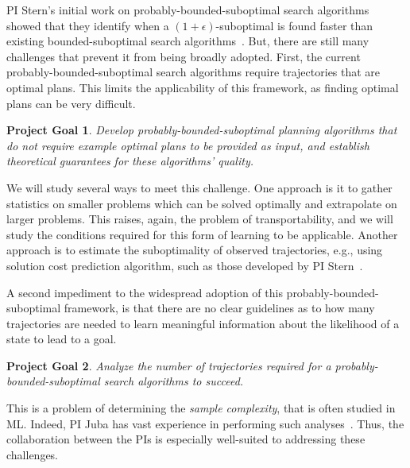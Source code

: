 \documentclass[12pt]{article}
\newtheorem{problem}{Project Goal}
\begin{document}

PI Stern's initial work on probably-bounded-suboptimal search algorithms showed 
that they identify when a $(1+\epsilon)$-suboptimal is found faster than existing bounded-suboptimal search algorithms~\cite{stern2011probably,stern2012search}.
But, there are still many challenges that prevent it from being broadly adopted. First, the current probably-bounded-suboptimal search algorithms require trajectories that are optimal plans. This limits the applicability of this framework, as finding optimal plans can be very difficult. 
\begin{problem}
Develop probably-bounded-suboptimal planning algorithms that do not require example optimal plans to be provided as input, and establish theoretical guarantees for these algorithms' quality.
\end{problem}
We will study several ways to meet this challenge. One approach is it to gather statistics on smaller problems which can be solved optimally and extrapolate on larger problems. This raises, again, the problem of transportability, and we will study the conditions required for this form of learning to be applicable. 
Another approach is to estimate the suboptimality of observed trajectories, e.g., using solution cost prediction algorithm, such as those developed by PI Stern~\cite{lelis2016predicting,lelis2011predicting}. 



A second impediment to the widespread adoption of this probably-bounded-suboptimal framework, is that there are no clear guidelines as to how many trajectories are needed to learn meaningful information about the likelihood of a state to lead to a goal. 
\begin{problem}
Analyze the number of trajectories required for a probably-bounded-suboptimal search algorithms to succeed.
\end{problem}
This is a problem of determining the {\em sample complexity}, that is often studied in ML. Indeed, PI Juba has vast experience in performing such analyses~\cite{goldreich2012theory,juba2013ijcai,juba2016jmlr,juba2016aaai,zhang2017aaai}. Thus, the collaboration between the PIs is especially well-suited to addressing these challenges. 
\end{document}
